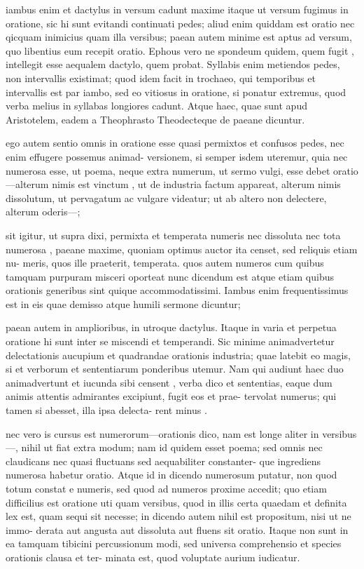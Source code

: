  iambus enim et dactylus in versum cadunt maxime itaque ut versum fugimus in oratione, sic hi sunt evitandi continuati pedes; aliud enim quiddam est oratio nec qicquam inimicius quam illa versibus; paean autem minime est aptus ad versum, quo libentius eum recepit oratio. Ephous vero ne spondeum quidem, quem fugit , intellegit esse aequalem dactylo, quem probat. Syllabis enim metiendos pedes, non intervallis existimat; quod idem facit in trochaeo, qui temporibus et intervallis est par iambo, sed eo vitiosus in oratione, si ponatur extremus, quod verba melius in syllabas longiores cadunt. Atque haec, quae sunt apud Aristotelem, eadem a Theophrasto Theodecteque de paeane dicuntur.

 ego autem sentio omnis in oratione esse quasi permixtos et confusos pedes, nec enim effugere possemus animad- versionem, si semper isdem uteremur, quia nec numerosa esse, ut poema, neque extra numerum, ut sermo vulgi, esse debet oratio—alterum nimis est vinctum , ut de industria factum appareat, alterum nimis dissolutum, ut pervagatum ac vulgare videatur; ut ab altero non delectere, alterum oderis—;

 sit igitur, ut supra dixi, permixta et temperata numeris nec dissoluta nec tota numerosa , paeane maxime, quoniam optimus auctor ita censet, sed reliquis etiam nu- meris, quos ille praeterit, temperata. quos autem numeros cum quibus tamquam purpuram misceri oporteat nunc dicendum est atque etiam quibus orationis generibus sint quique accommodatissimi. Iambus enim frequentissimus est in eis quae demisso atque humili sermone dicuntur;

 paean autem in amplioribus, in utroque dactylus. Itaque in varia et perpetua oratione hi sunt inter se miscendi et temperandi. Sic minime animadvertetur delectationis aucupium et quadrandae orationis industria; quae latebit eo magis, si et verborum et sententiarum ponderibus utemur. Nam qui audiunt haec duo animadvertunt et iucunda sibi censent , verba dico et sententias, eaque dum animis attentis admirantes excipiunt, fugit eos et prae- tervolat numerus; qui tamen si abesset, illa ipsa delecta- rent minus .

 nec vero is cursus est numerorum—orationis dico, nam est longe aliter in versibus—, nihil ut fiat extra modum; nam id quidem esset poema; sed omnis nec claudicans nec quasi fluctuans sed aequabiliter constanter- que ingrediens numerosa habetur oratio. Atque id in dicendo numerosum putatur, non quod totum constat e numeris, sed quod ad numeros proxime accedit; quo etiam difficilius est oratione uti quam versibus, quod in illis certa quaedam et definita lex est, quam sequi sit necesse; in dicendo autem nihil est propositum, nisi ut ne immo- derata aut angusta aut dissoluta aut fluens sit oratio. Itaque non sunt in ea tamquam tibicini percussionum modi, sed universa comprehensio et species orationis clausa et ter- minata est, quod voluptate aurium iudicatur.

